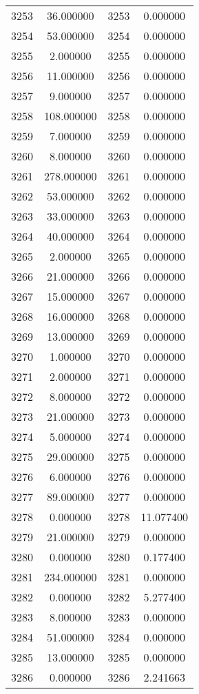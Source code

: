 \documentclass[12pt]{article}
\begin{document}
\begin{longtable}{@{}cccc@{}}
3253 & 36.000000 & 3253 & 0.000000 \\
3254 & 53.000000 & 3254 & 0.000000 \\
3255 & 2.000000 & 3255 & 0.000000 \\
3256 & 11.000000 & 3256 & 0.000000 \\
3257 & 9.000000 & 3257 & 0.000000 \\
3258 & 108.000000 & 3258 & 0.000000 \\
3259 & 7.000000 & 3259 & 0.000000 \\
3260 & 8.000000 & 3260 & 0.000000 \\
3261 & 278.000000 & 3261 & 0.000000 \\
3262 & 53.000000 & 3262 & 0.000000 \\
3263 & 33.000000 & 3263 & 0.000000 \\
3264 & 40.000000 & 3264 & 0.000000 \\
3265 & 2.000000 & 3265 & 0.000000 \\
3266 & 21.000000 & 3266 & 0.000000 \\
3267 & 15.000000 & 3267 & 0.000000 \\
3268 & 16.000000 & 3268 & 0.000000 \\
3269 & 13.000000 & 3269 & 0.000000 \\
3270 & 1.000000 & 3270 & 0.000000 \\
3271 & 2.000000 & 3271 & 0.000000 \\
3272 & 8.000000 & 3272 & 0.000000 \\
3273 & 21.000000 & 3273 & 0.000000 \\
3274 & 5.000000 & 3274 & 0.000000 \\
3275 & 29.000000 & 3275 & 0.000000 \\
3276 & 6.000000 & 3276 & 0.000000 \\
3277 & 89.000000 & 3277 & 0.000000 \\
3278 & 0.000000 & 3278 & 11.077400 \\
3279 & 21.000000 & 3279 & 0.000000 \\
3280 & 0.000000 & 3280 & 0.177400 \\
3281 & 234.000000 & 3281 & 0.000000 \\
3282 & 0.000000 & 3282 & 5.277400 \\
3283 & 8.000000 & 3283 & 0.000000 \\
3284 & 51.000000 & 3284 & 0.000000 \\
3285 & 13.000000 & 3285 & 0.000000 \\
3286 & 0.000000 & 3286 & 2.241663 \\

\end{longtable}
\end{document}

